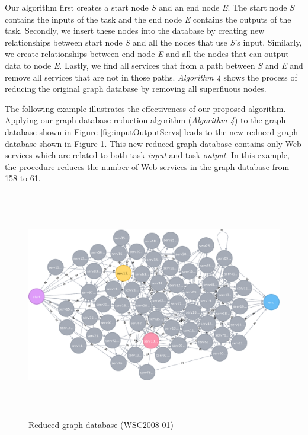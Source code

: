 \par

Our algorithm first creates a start node \emph{S} and an end node \emph{E}. The start node \emph{S} contains the inputs of the task and the end node \emph{E}  contains the outputs of the task. Secondly, we insert these nodes into the database by creating new relationships between start node \emph{S} and all the nodes that use \emph{S}'s input. Similarly, we create relationships between end node \emph{E} and all the nodes that can output data to node \emph{E}. Lastly, we find all services that from a path between \emph{S} and \emph{E} and remove all services that are not in those paths. \emph{Algorithm 4} shows the process of reducing the original graph database by removing all superfluous nodes.

\begin{exmp}
\noindent
The following example illustrates the effectiveness of our proposed algorithm. Applying our graph database reduction algorithm (\emph{Algorithm 4}) to the graph database shown in Figure \ref{fig:inputOutputServs} leads to the new reduced graph database shown in Figure \ref{fig:reduced}. This new reduced graph database contains only Web services which are related to both task \emph{input} and task \emph{output}. In this example, the procedure reduces the number of Web services in the graph database from 158 to 61.
\end{exmp}

\begin{figure}[H]
\includegraphics[width = 13cm, height = 10cm, scale = 0.5]{svg-reduced.pdf}
\centering
\caption{Reduced graph database (WSC2008-01)}
\label{fig:reduced} 
\end{figure} 

